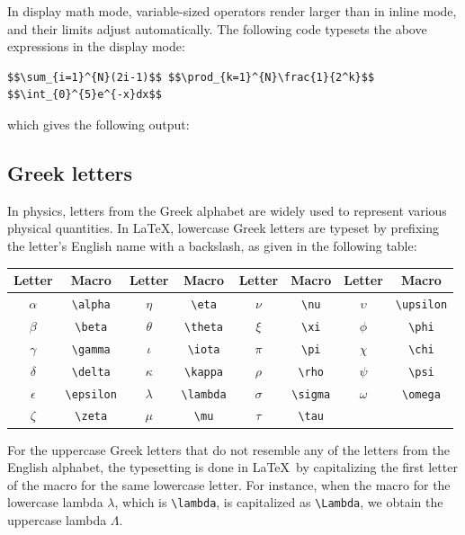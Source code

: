 		In display math mode, variable-sized operators render larger than in inline mode, and their limits adjust automatically. The following code typesets the above expressions in the display mode:
\begin{lstlisting}
$$\sum_{i=1}^{N}(2i-1)$$ $$\prod_{k=1}^{N}\frac{1}{2^k}$$ $$\int_{0}^{5}e^{-x}dx$$
\end{lstlisting}
		which gives the following output:
	
	\subsection{Greek letters}
		In physics, letters from the Greek alphabet are widely used to represent various physical quantities. In \LaTeX, lowercase Greek letters are typeset by prefixing the letter's English name with a backslash, as given in the following table:
		\begin{table}[h!]
			\centering
			\begin{tabular}{|cc|cc|cc|cc|}
				\hline
				\textbf{Letter} & \textbf{Macro} & \textbf{Letter} & \textbf{Macro} & \textbf{Letter} & \textbf{Macro} & \textbf{Letter} & \textbf{Macro} \\
				\hline
				{$\alpha$} & {\lstinline|\alpha|} & {$\eta$} & {\lstinline|\eta|} & {$\nu$} & {\lstinline|\nu|} & {$\upsilon$} & {\lstinline|\upsilon|} \\
				{$\beta$} & {\lstinline|\beta|} & {$\theta$} & {\lstinline|\theta|} & {$\xi$} & {\lstinline|\xi|} & {$\phi$} & {\lstinline|\phi|} \\
				{$\gamma$} & {\lstinline|\gamma|} & {$\iota$} & {\lstinline|\iota|} & {$\pi$} & {\lstinline|\pi|} & {$\chi$} & {\lstinline|\chi|} \\
				{$\delta$} & {\lstinline|\delta|} & {$\kappa$} & {\lstinline|\kappa|} & {$\rho$} & {\lstinline|\rho|} & {$\psi$} & {\lstinline|\psi|} \\
				{$\epsilon$} & {\lstinline|\epsilon|} & {$\lambda$} & {\lstinline|\lambda|} & {$\sigma$} & {\lstinline|\sigma|} & {$\omega$} & {\lstinline|\omega|} \\
				{$\zeta$} & {\lstinline|\zeta|} & {$\mu$} & {\lstinline|\mu|} & {$\tau$} & {\lstinline|\tau|} & {} & {} \\
				\hline
			\end{tabular}
		\end{table}
		
		For the uppercase Greek letters that do not resemble any of the letters from the English alphabet, the typesetting is done in \LaTeX\ by capitalizing the first letter of the macro for the same lowercase letter. For instance, when the macro for the lowercase lambda $\lambda$, which is \lstinline|\lambda|, is capitalized as \lstinline|\Lambda|, we obtain the uppercase lambda $\Lambda$.
		
